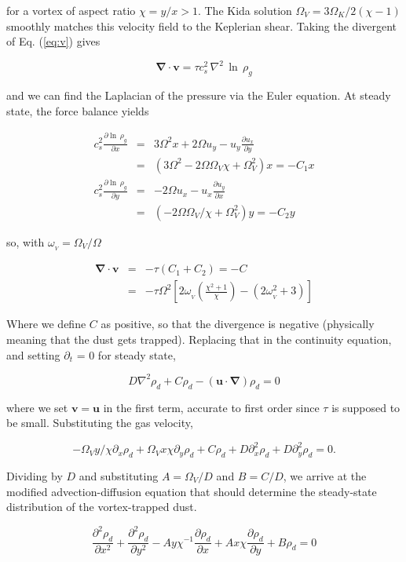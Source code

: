 \documentclass[useAMS,8pt,twocolumn]{article}
\newcommand{\pderiv}[2]{\frac{\partial #1}{\partial #2}}
\newcommand{\pderivn}[3]{\frac{\partial^{#3} #1}{\partial #2^{#3}}}
\renewcommand{\v}[1]{{\boldsymbol{#1}}} %
\newcommand{\del}{\v{\nabla}}
\newcommand{\Div}{\del\cdot}
\newcommand{\Laplace}{\nabla^2}
\newcommand{\Eq}[1]{Eq. (\ref{#1})}
\newcommand{\eq}[1]{\Eq{#1}}
\newcommand{\beq}{\begin{equation}}
\newcommand{\eeq}{\end{equation}}
\newcommand{\beqn}{\begin{eqnarray}}
\newcommand{\eeqn}{\end{eqnarray}}
\begin{document}
\noindent for a vortex of aspect ratio $\chi= y/x > 1$. The Kida
solution $\varOmega_V = 3\Omega_K/2(\chi-1)$ smoothly matches 
this velocity field to the Keplerian shear. Taking the divergent of
\eq{eq:v} gives 

\beq
\Div{\v{v}} = \tau c_s^2 \, \Laplace{\, \ln \, \rho_g} 
\label{eq:divv}
\eeq

\noindent and we can find the Laplacian of the pressure via the Euler
equation. At steady state, the force balance yields 

\begin{eqnarray}
c_s^2 \pderiv{\ln \,\rho_g}{x} &=& 3\varOmega^2 x + 2\varOmega u_y -
u_y\pderiv{u_x}{y} \nonumber \\
&=& \left(3\varOmega^2 - 2\Omega\Omega_V \chi + \varOmega_V^2\right) x  = -C_1 x  \\
c_s^2 \pderiv{\ln \,\rho_g}{y} &=& - 2\varOmega u_x -
u_x\pderiv{u_y}{x} \nonumber \\
&=& \left(-2\Omega\Omega_V/\chi + \Omega_V^2\right) y = -C_2 y
\end{eqnarray}

\noindent  so, with $\omega_{_V}=\varOmega_V/\varOmega$

\beqn
\Div{\v{v}} &=& -\tau (C_1+C_2) = - C\\
&=& - \tau\varOmega^2 \left[2\omega_{_V}\left(\frac{\chi^2+1}{\chi}\right) - (2\omega_{_V}^2 + 3) \right]
\eeqn

\noindent Where we define $C$ as positive, so that the divergence is negative (physically meaning that the dust gets trapped). Replacing that in the continuity equation, and setting $\partial_t$ =
0 for steady state, 

\beq
D\Laplace{\rho_d} + C\rho_d -  (\v{u}\cdot\del)\rho_d = 0 
\eeq

\noindent where we set $\v{v}=\v{u}$ in the first term, accurate to
first order since $\tau$ is supposed to be small. Substituting the gas velocity,

\beq
   -\Omega_V y / \chi \partial_x \rho_d +  \Omega_V x \chi \partial_y
  \rho_d + C \rho_d  + D\partial_x^2{\rho_d} + D\partial_y^2{\rho_d} = 0.
\eeq

Dividing by $D$ and substituting $A=\varOmega_V/D$ and $B=C/D$, we
arrive at the modified advection-diffusion equation that should
determine the steady-state distribution of the vortex-trapped dust.

\beq
  \pderivn{\rho_d}{x}{2} + \pderivn{\rho_d}{y}{2} - A  y\chi^{-1} \pderiv{\rho_d}{x} +  A x \chi \pderiv{\rho_d}{y} + B \rho_d   = 0 
\eeq
\end{document}
